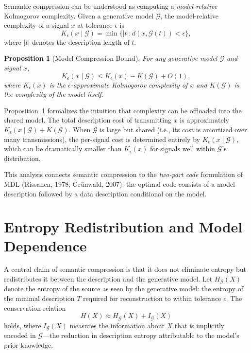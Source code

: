 \documentclass[11pt,a4paper]{article}
\newtheorem{proposition}[theorem]{Proposition}
\theoremstyle{definition}
\theoremstyle{remark}
\begin{document}
Semantic compression can be understood as computing a \emph{model-relative} Kolmogorov complexity. Given a generative model $\mathcal{G}$, the model-relative complexity of a signal $x$ at tolerance $\epsilon$ is
\[
K_\epsilon(x \mid \mathcal{G}) = \min \{ |t| : d(x, \mathcal{G}(t)) < \epsilon \},
\]
where $|t|$ denotes the description length of $t$.

\begin{proposition}[Model Compression Bound]
\label{prop:kolmogorov}
For any generative model $\mathcal{G}$ and signal $x$,
\[
K_\epsilon(x \mid \mathcal{G}) \le K_\epsilon(x) - K(\mathcal{G}) + O(1),
\]
where $K_\epsilon(x)$ is the $\epsilon$-approximate Kolmogorov complexity of $x$ and $K(\mathcal{G})$ is the complexity of the model itself.
\end{proposition}

Proposition~\ref{prop:kolmogorov} formalizes the intuition that complexity can be offloaded into the shared model. The total description cost of transmitting $x$ is approximately $K_\epsilon(x \mid \mathcal{G}) + K(\mathcal{G})$. When $\mathcal{G}$ is large but shared (i.e., its cost is amortized over many transmissions), the per-signal cost is determined entirely by $K_\epsilon(x \mid \mathcal{G})$, which can be dramatically smaller than $K_\epsilon(x)$ for signals well within $\mathcal{G}$'s distribution.

This analysis connects semantic compression to the \emph{two-part code} formulation of MDL (Rissanen, 1978; Gr\"{u}nwald, 2007): the optimal code consists of a model description followed by a data description conditional on the model.

\section{Entropy Redistribution and Model Dependence}
\label{sec:entropy}

A central claim of semantic compression is that it does not eliminate entropy but redistributes it between the description and the generative model. Let $H_{\mathcal{G}}(X)$ denote the entropy of the source as seen by the generative model: the entropy of the minimal description $T$ required for reconstruction to within tolerance $\epsilon$. The conservation relation
\[
H(X) \approx H_{\mathcal{G}}(X) + I_{\mathcal{G}}(X)
\]
holds, where $I_{\mathcal{G}}(X)$ measures the information about $X$ that is implicitly encoded in $\mathcal{G}$---the reduction in description entropy attributable to the model's prior knowledge.
\end{document}
